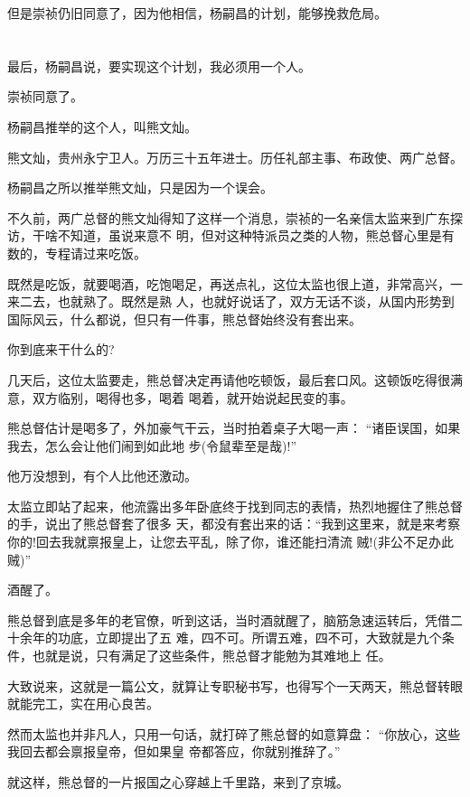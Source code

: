 \documentclass[11pt,a4paper,onecolumn]{article}
\begin{document}
但是崇祯仍旧同意了，因为他相信，杨嗣昌的计划，能够挽救危局。

\section[\thesection]{}

最后，杨嗣昌说，要实现这个计划，我必须用一个人。

崇祯同意了。

杨嗣昌推举的这个人，叫熊文灿。

熊文灿，贵州永宁卫人。万历三十五年进士。历任礼部主事、布政使、两广总督。

杨嗣昌之所以推举熊文灿，只是因为一个误会。

不久前，两广总督的熊文灿得知了这样一个消息，崇祯的一名亲信太监来到广东探访，干啥不知道，虽说来意不
明，但对这种特派员之类的人物，熊总督心里是有数的，专程请过来吃饭。

既然是吃饭，就要喝酒，吃饱喝足，再送点礼，这位太监也很上道，非常高兴，一来二去，也就熟了。既然是熟
人，也就好说话了，双方无话不谈，从国内形势到国际风云，什么都说，但只有一件事，熊总督始终没有套出来。

你到底来干什么的?

几天后，这位太监要走，熊总督决定再请他吃顿饭，最后套口风。这顿饭吃得很满意，双方临别，喝得也多，喝着
喝着，就开始说起民变的事。

熊总督估计是喝多了，外加豪气干云，当时拍着桌子大喝一声： ``诸臣误国，如果我去，怎么会让他们闹到如此地
步(令鼠辈至是哉)!''

他万没想到，有个人比他还激动。

太监立即站了起来，他流露出多年卧底终于找到同志的表情，热烈地握住了熊总督的手，说出了熊总督套了很多
天，都没有套出来的话：``我到这里来，就是来考察你的!回去我就禀报皇上，让您去平乱，除了你，谁还能扫清流
贼!(非公不足办此贼)''

酒醒了。

熊总督到底是多年的老官僚，听到这话，当时酒就醒了，脑筋急速运转后，凭借二十余年的功底，立即提出了五
难，四不可。所谓五难，四不可，大致就是九个条件，也就是说，只有满足了这些条件，熊总督才能勉为其难地上
任。

大致说来，这就是一篇公文，就算让专职秘书写，也得写个一天两天，熊总督转眼就能完工，实在用心良苦。

然而太监也并非凡人，只用一句话，就打碎了熊总督的如意算盘： ``你放心，这些我回去都会禀报皇帝，但如果皇
帝都答应，你就别推辞了。''

就这样，熊总督的一片报国之心穿越上千里路，来到了京城。
\end{document}
